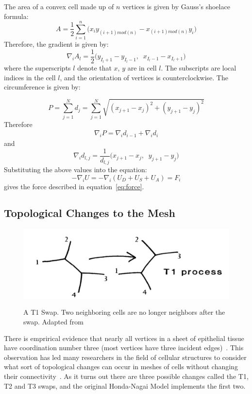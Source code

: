  The area of a convex cell made up of $n$ vertices is given by Gauss's shoelace formula:
\begin{equation}
A = \frac12\sum\limits_{i=1}^n\Big(x_iy_{(i+1)mod(n)}-x_{(i+1)mod(n)}y_i\Big)
\end{equation}
Therefore, the gradient is given by:
\begin{equation}
\nabla_i A_l = \frac12
\Big(
y_{I_l+1} - y_{I_l-1},\;\;x_{I_l-1} - x_{I_l+1}
\Big)
\end{equation}
 where the superscripts $l$ denote that $x$, $y$ are in cell $l$. The subscripts are local indices in the cell $l$, and the orientation of vertices is counterclockwise. The circumference is given by:

\begin{equation}
P = \sum\limits_{j=1}^Nd_j = \sum\limits_{j=1}^N\sqrt{(x_{j+1} - x_j)^2 + (y_{j+1} - y_j)^2}
\end{equation}
Therefore
\begin{gather}
\nabla_iP = \nabla_id_{i-1} + \nabla_id_i
\end{gather}
and
\begin{equation}
\nabla_id_{l, j} = \frac1{d_{l, j}}
\Big(
x_{j+1}- x_j,\;\; y_{j+1} - y_j
\Big)
\end{equation}
Substituting the above values into the equation:
\begin{equation}
-\nabla_iU = -\nabla_i(U_D + U_S + U_A) = F_i
\end{equation}
gives the force described in equation~\ref{eq:force}.

\subsection{Topological Changes to the Mesh}
\begin{figure}
    \centering
    \includegraphics[width=\textwidth, keepaspectratio]{../diagrams/t1.png}
    \label{fig:t1}
    \caption[A T1 Swap]{A T1 Swap. Two neighboring cells are no longer neighbors after the swap. Adapted from~\cite{Soap}}
\end{figure}
There is emprirical evidence that nearly all vertices in a sheet of epithelial tissue have coordination number three (most vertices have three incident edges)~\cite{EpithelialTopology}. This observation has led many researchers in the field of cellular structures to consider what sort of topological changes can occur in meshes of cells without changing their connectivity~\cite{Soap}.  As it turns out there are three possible changes called the T1, T2 and T3 swaps, and the original Honda-Nagai Model implements the first two.

